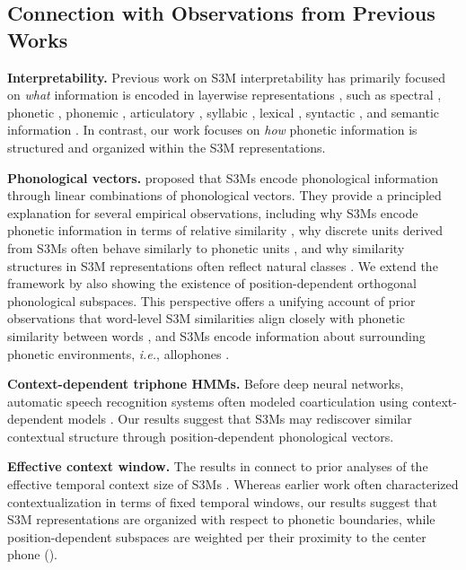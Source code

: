 \documentclass[cameraready]{Interspeech}
\begin{document}
\subsection{Connection with Observations from Previous Works}
\textbf{Interpretability.} Previous work on S3M interpretability has primarily focused on \emph{what} information is encoded in layerwise representations \cite{pasad2021layer,pasad2023comparative}, such as spectral \cite{choi2022opening,pasad2021layer}, phonetic \cite{choi2024understanding,martin2023probing,choi2024self}, phonemic \cite{martin2023probing}, articulatory \cite{cho2023sslart,cho2024ssluniart}, syllabic \cite{baade2025syllablelm,cho2026sylber,cho2025sylber}, lexical \cite{peng2022word,pasad2024self,choi2024self}, syntactic \cite{shen2023wave}, and semantic information \cite{pasad2024self,choi2024self}.
In contrast, our work focuses on \emph{how} phonetic information is structured and organized within the S3M representations.


\textbf{Phonological vectors.}
\cite{choi2026self} proposed that S3Ms encode phonological information through linear combinations of phonological vectors.
They provide a principled explanation for several empirical observations, including why S3Ms encode phonetic information in terms of relative similarity \cite{choi2022opening,choi2024self}, why discrete units derived from S3Ms often behave similarly to phonetic units \cite{chang2024exploring,baevski2020wav2vec,hsu2021hubert,wells22_interspeech}, and why similarity structures in S3M representations often reflect natural classes \cite{abdullah2023information,sicherman2023analysing}.
We extend the framework by also showing the existence of position-dependent orthogonal phonological subspaces.
This perspective offers a unifying account of prior observations that word-level S3M similarities align closely with phonetic similarity between words \cite{pasad2024self,choi2024self}, and S3Ms encode information about surrounding phonetic environments, \textit{i.e.}, allophones \cite{choi2025leveraging}.


\textbf{Context-dependent triphone HMMs.}
Before deep neural networks, automatic speech recognition systems often modeled coarticulation using context-dependent models \cite{schwartz1985context,young1994tree}.
Our results suggest that S3Ms may rediscover similar contextual structure through position-dependent phonological vectors.


\textbf{Effective context window.}
The results in  connect to prior analyses of the effective temporal context size of S3Ms \cite{meng25b_interspeech,choi2025device}.
Whereas earlier work often characterized contextualization in terms of fixed temporal windows, our results suggest that S3M representations are organized with respect to phonetic boundaries, while position-dependent subspaces are weighted per their proximity to the center phone ().
\end{document}
